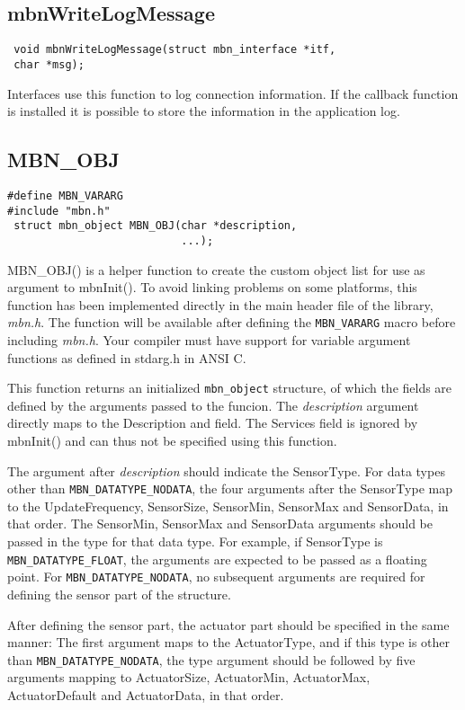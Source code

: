 \subsection{mbnWriteLogMessage}
\begin{verbatim}
 void mbnWriteLogMessage(struct mbn_interface *itf,
 char *msg);
\end{verbatim}
Interfaces use this function to log connection information. If the callback function is installed it is possible to store the information in the application log.


\subsection{MBN\_OBJ}
\begin{verbatim}
#define MBN_VARARG
#include "mbn.h"
 struct mbn_object MBN_OBJ(char *description,
                           ...);
\end{verbatim}
MBN\_OBJ() is a helper function to create the custom object list for use as argument to mbnInit(). To avoid linking problems on some platforms, this function has been implemented directly in the main header file of the library, \textit{mbn.h}. The function will be available after defining the \verb|MBN_VARARG| macro before including \textit{mbn.h}. Your compiler must have support for variable argument functions as defined in stdarg.h in ANSI C.

This function returns an initialized \verb|mbn_object| structure, of which the fields are defined by the arguments passed to the funcion. The \textit{description} argument directly maps to the Description and field. The Services field is ignored by mbnInit() and can thus not be specified using this function.

The argument after \textit{description} should indicate the SensorType. For data types other than \verb|MBN_DATATYPE_NODATA|, the four arguments after the SensorType map to the UpdateFrequency, SensorSize, SensorMin, SensorMax and SensorData, in that order. The SensorMin, SensorMax and SensorData arguments should be passed in the type for that data type. For example, if SensorType is \verb|MBN_DATATYPE_FLOAT|, the arguments are expected to be passed as a floating point. For \verb|MBN_DATATYPE_NODATA|, no subsequent arguments are required for defining the sensor part of the structure.

After defining the sensor part, the actuator part should be specified in the same manner: The first argument maps to the ActuatorType, and if this type is other than \verb|MBN_DATATYPE_NODATA|, the type argument should be followed by five arguments mapping to ActuatorSize, ActuatorMin, ActuatorMax, ActuatorDefault and ActuatorData, in that order.




